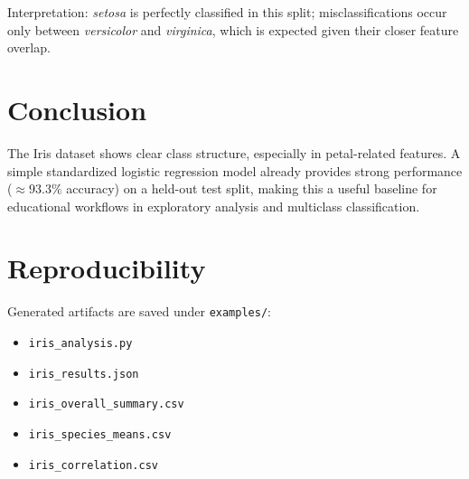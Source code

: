 \documentclass[11pt]{article}
\begin{document}
Interpretation: \emph{setosa} is perfectly classified in this split; misclassifications occur only between
\emph{versicolor} and \emph{virginica}, which is expected given their closer feature overlap.

\section{Conclusion}
The Iris dataset shows clear class structure, especially in petal-related features.
A simple standardized logistic regression model already provides strong performance ($\approx 93.3\%$ accuracy)
on a held-out test split, making this a useful baseline for educational workflows in exploratory analysis
and multiclass classification.

\section*{Reproducibility}
Generated artifacts are saved under \texttt{examples/}:
\begin{itemize}
    \item \texttt{iris\_analysis.py}
    \item \texttt{iris\_results.json}
    \item \texttt{iris\_overall\_summary.csv}
    \item \texttt{iris\_species\_means.csv}
    \item \texttt{iris\_correlation.csv}
\end{itemize}
\end{document}
